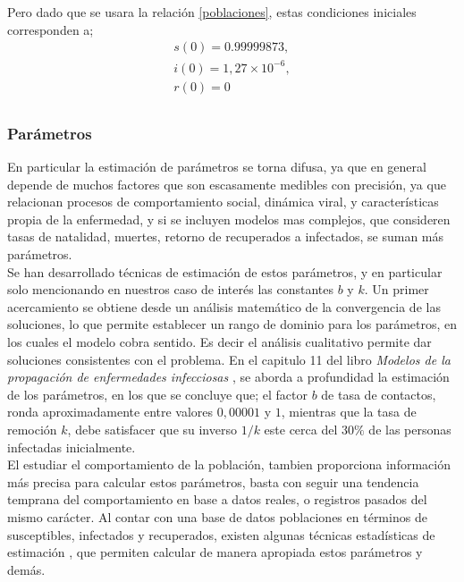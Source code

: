\documentclass[journal]{IEEEtran}
\begin{document}
Pero dado que se usara la relación \ref{poblaciones}, estas condiciones iniciales corresponden a;
\begin{equation}
  \begin{split}
    s(0) = 0. 99999873,\\
    i(0) = 1, 27 \times 10^{-6},\\
    r(0) = 0\\
  \end{split}
\end{equation}

\subsubsection{Parámetros}
En particular la estimación de parámetros se torna difusa,
ya que en general depende de muchos factores que son escasamente medibles
con precisión, ya que relacionan procesos de comportamiento social, dinámica viral,
y características propia de la enfermedad, y si se incluyen modelos mas complejos,
que consideren tasas de natalidad, muertes, retorno de recuperados a infectados,
se suman más parámetros.\\

Se han desarrollado técnicas de estimación de estos parámetros, y en particular solo mencionando
en nuestros caso de interés las constantes $b$ y $k$. Un primer acercamiento se obtiene
desde un análisis matemático de la convergencia de las soluciones, lo que permite establecer
un rango de dominio para los parámetros, en los cuales el modelo cobra sentido. Es decir
el análisis cualitativo permite dar soluciones consistentes con el problema. En el capitulo 11
del libro \textit{Modelos de la propagación de enfermedades infecciosas} \cite{Modelos de propagacion
}, se aborda a profundidad la estimación de los parámetros, en los que se concluye que;
el factor $b$ de tasa de contactos, ronda aproximadamente entre valores $0,00001$ y $1$, mientras que la tasa de remoción
$k$, debe satisfacer que su inverso $1/k$ este cerca del $30\%$ de las personas infectadas inicialmente.\\

El estudiar el comportamiento de la población, tambien proporciona información más precisa para
calcular estos parámetros, basta con seguir una tendencia temprana del comportamiento en base a datos
reales, o registros pasados del mismo carácter. Al contar con una base de datos poblaciones en términos de susceptibles, infectados
y recuperados, existen algunas técnicas estadísticas de estimación \cite{Modelos de propagacion}, que permiten calcular de manera apropiada
estos parámetros y demás.\\
\end{document}

